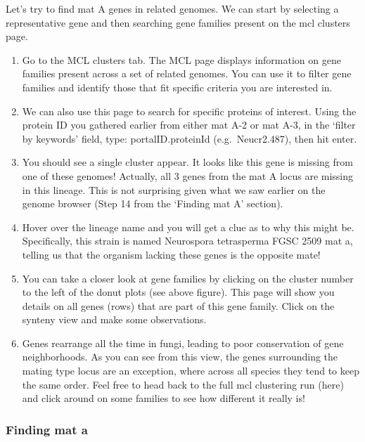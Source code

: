 \documentclass[
  letterpaper,
  DIV=11,
  numbers=noendperiod]{scrreprt}
\providecommand{\tightlist}{%
  \setlength{\itemsep}{0pt}\setlength{\parskip}{0pt}}
\begin{document}
Let's try to find mat A genes in related genomes. We can start by
selecting a representative gene and then searching gene families present
on the mcl clusters page.

\begin{enumerate}
\def\labelenumi{\arabic{enumi}.}
\tightlist
\item
  Go to the MCL clusters tab. The MCL page displays information on gene
  families present across a set of related genomes. You can use it to
  filter gene families and identify those that fit specific criteria you
  are interested in.
\item
  We can also use this page to search for specific proteins of interest.
  Using the protein ID you gathered earlier from either mat A-2 or mat
  A-3, in the `filter by keywords' field, type: portalID.proteinId
  (e.g.~Neucr2.487), then hit enter.
\item
  You should see a single cluster appear. It looks like this gene is
  missing from one of these genomes! Actually, all 3 genes from the mat
  A locus are missing in this lineage. This is not surprising given what
  we saw earlier on the genome browser (Step 14 from the `Finding mat A'
  section).
\item
  Hover over the lineage name and you will get a clue as to why this
  might be. Specifically, this strain is named Neurospora tetrasperma
  FGSC 2509 mat a, telling us that the organism lacking these genes is
  the opposite mate!
\item
  You can take a closer look at gene families by clicking on the cluster
  number to the left of the donut plots (see above figure). This page
  will show you details on all genes (rows) that are part of this gene
  family. Click on the synteny view and make some observations.
\item
  Genes rearrange all the time in fungi, leading to poor conservation of
  gene neighborhoods. As you can see from this view, the genes
  surrounding the mating type locus are an exception, where across all
  species they tend to keep the same order. Feel free to head back to
  the full mcl clustering run (here) and click around on some families
  to see how different it really is!
\end{enumerate}

\subsubsection*{Finding mat a}\label{finding-mat-a-1}
\end{document}
